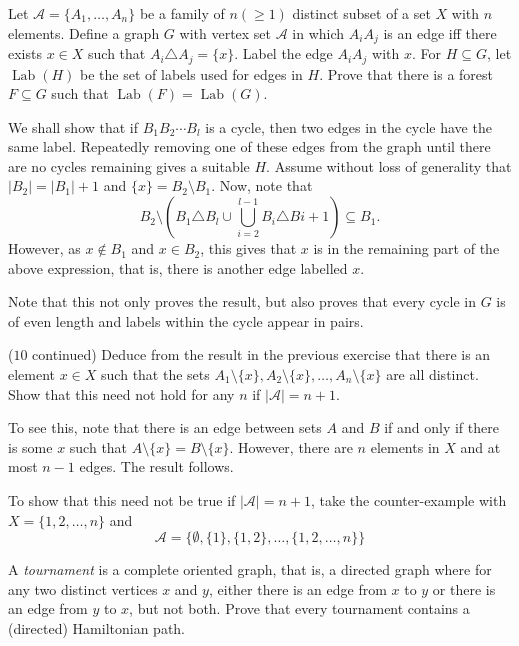 \begin{exercise}
Let $\mathscr{A}=\{A_1,\ldots,A_n\}$ be a family of $n(\geq 1)$ distinct subset of a set $X$ with $n$ elements. Define a graph $G$ with vertex set $\mathscr{A}$ in which $A_iA_j$ is an edge iff there exists $x\in X$ such that $A_i\triangle A_j=\{x\}$. Label the edge $A_iA_j$ with $x$. For $H\subseteq G$, let $\operatorname{Lab}(H)$ be the set of labels used for edges in $H$. Prove that there is a forest $F\subseteq G$ such that $\operatorname{Lab}(F)=\operatorname{Lab}(G)$.
\end{exercise}
\begin{solution}
We shall show that if $B_1B_2\cdots B_l$ is a cycle, then two edges in the cycle have the same label. Repeatedly removing one of these edges from the graph until there are no cycles remaining gives a suitable $H$. Assume without loss of generality that $|B_2|=|B_1|+1$ and $\{x\}= B_2\setminus B_1$. Now, note that $$B_2\setminus\left(B_1\triangle B_l\cup\bigcup_{i=2}^{l-1} B_i\triangle B{i+1}\right)\subseteq B_1.$$
However, as $x\not\in B_1$ and $x\in B_2$, this gives that $x$ is in the remaining part of the above expression, that is, there is another edge labelled $x$.

Note that this not only proves the result, but also proves that every cycle in $G$ is of even length and labels within the cycle appear in pairs.
\end{solution}

\begin{exercise}
($10$ continued) Deduce from the result in the previous exercise that there is an element $x\in X$ such that the sets $A_1\setminus\{x\},A_2\setminus\{x\},\ldots,A_n\setminus\{x\}$ are all distinct. Show that this need not hold for any $n$ if $|\mathscr{A}|=n+1$.
\end{exercise}
\begin{solution}
To see this, note that there is an edge between sets $A$ and $B$ if and only if there is some $x$ such that $A\setminus\{x\}=B\setminus\{x\}$. However, there are $n$ elements in $X$ and at most $n-1$ edges. The result follows.

To show that this need not be true if $|\mathscr{A}|=n+1$, take the counter-example with $X=\{1,2,\ldots,n\}$ and
$$\mathscr{A} = \{\emptyset, \{1\}, \{1,2\}, \ldots, \{1,2,\ldots,n\}\}$$
\end{solution}

\begin{exercise}
A \textit{tournament} is a complete oriented graph, that is, a directed graph where for any two distinct vertices $x$ and $y$, either there is an edge from $x$ to $y$ or there is an edge from $y$ to $x$, but not both. Prove that every tournament contains a (directed) Hamiltonian path.
\end{exercise}

